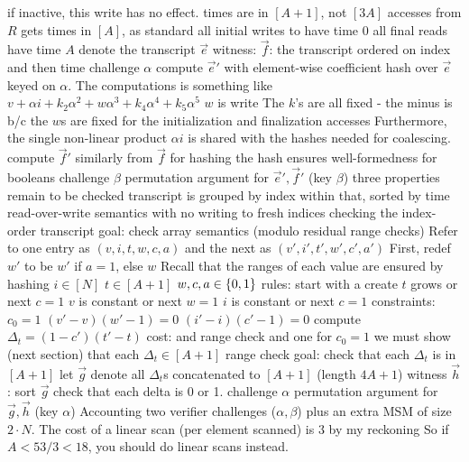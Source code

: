 \begin{outline}
      \4 if inactive, this write has no effect.
    \3 times are in $[A+1]$, not $[3A]$
      \4 accesses from $R$ gets times in $[A]$, as standard
      \4 all initial writes to have time 0
      \4 all final reads have time $A$
  \2 denote the transcript $\vec e$
  \2 witness: $\vec f$: the transcript ordered on index and then time
  \2 challenge $\alpha$
  \2 compute $\vec e'$ with element-wise coefficient hash over $\vec e$ keyed on $\alpha$.
    \3 The computations is something like $v + \alpha i + k_2 \alpha^2 + w \alpha^3 + k_4 \alpha^4 + k_5 \alpha^5$
      \4 $w$ is write
    \3 The $k$'s are all fixed
    \3  - 
      \4 the minus is b/c the $w$s are fixed
         for the initialization and finalization accesses
    \3 Furthermore, the single non-linear product $\alpha i$ is shared with the
    hashes needed for coalescing.
  \2 compute $\vec f'$ similarly from $\vec f$
    \3  for hashing
    \3 the hash ensures well-formedness for booleans
  \2 challenge $\beta$
  \2 permutation argument for $\vec e', \vec f'$ (key $\beta$)
    \3 
  \2 three properties remain to be checked
    \3 transcript is grouped by index
    \3 within that, sorted by time
    \3 read-over-write semantics
      \4 with no writing to fresh indices
\1 checking the index-order transcript
  \2 goal: check array semantics (modulo residual range checks)
  \2 Refer to one entry as $(v, i, t, w, c, a)$ and the next as $(v', i', t', w', c', a')$
  \2 First, redef $w'$ to be $w'$ if $a=1$, else $w$
    \3 
  \2 Recall that the ranges of each value are ensured by hashing
    \3 $i \in [N]$
    \3 $t \in [A+1]$
    \3 $w, c, a \in \{0,1\}$
  \2 rules:
    \3 start with a create
    \3 $t$ grows or next $c=1$
    \3 $v$ is constant or next $w=1$
    \3 $i$ is constant or next $c=1$
  \2 constraints:
    \3 $c_0 = 1$
    \3 $(v'-v)(w'-1)=0$
    \3 $(i'-i)(c'-1)=0$
    \3 compute $\Delta_t = (1-c')(t'-t)$
    \3 cost: 
      \4 and range check
      \4 and one for $c_0 = 1$
    \3 we must show (next section) that each $\Delta_t \in [A+1]$
\1 range check
  \2 goal: check that each $\Delta_t$ is in $[A+1]$
  \2 let $\vec g$ denote all $\Delta_t$s concatenated to $[A+1]$ (length $4A+1$)
  \2 witness $\vec h$: sort $\vec g$
    \3 check that each delta is 0 or 1. 
  \2 challenge $\alpha$
  \2 permutation argument for $\vec g, \vec h$ (key $\alpha$)
    \3 
\1 Accounting
  \2 two verifier challenges ($\alpha,\beta$)
  \2 
    \3 plus an extra MSM of size $2\cdot N$.
  \2 
    \3 The cost of a linear scan (per element scanned) is $3$ by my reckoning
    \3 So if $A < 53/3 < 18$, you should do linear scans instead.
\end{outline}
